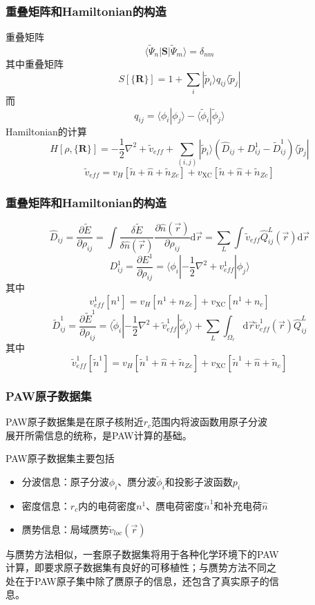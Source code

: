 \documentclass[cjk,slidestop,compress,mathserif,blue]{beamer}
\begin{document}
\frame
{
	\frametitle{重叠矩阵和Hamiltonian的构造}
重叠矩阵
	\begin{displaymath}
		\langle\tilde\Psi_n|\mathbf{S}|\tilde\Psi_m\rangle=\delta_{nm}
	\end{displaymath}
	其中重叠矩阵$$S[\{\mathbf{R}\}]=1+\sum_i|\tilde p_i\rangle q_{ij}\langle\tilde p_j|$$
	而$$q_{ij}=\langle\phi_i|\phi_j\rangle-\langle\tilde\phi_i|\tilde\phi_j\rangle$$
	\textrm{Hamiltonian}的计算
	\begin{displaymath}
		H[\rho,\{\mathbf{R}\}]=-\dfrac12\nabla^2+\tilde v_{eff}+\sum_{(i,j)}|\tilde p_i\rangle(\hat D_{ij}+D_{ij}^1-\tilde D_{ij}^1)\langle\tilde p_j|	
	\end{displaymath}
	$$\tilde v_{eff}=v_H[\tilde n+\hat n+\tilde n_{Zc}]+v_{\mathrm{XC}}[\tilde n+\hat n+\tilde n_{Zc}]$$
}

\frame
{
	\frametitle{重叠矩阵和Hamiltonian的构造}
	$$\hat D_{ij}=\dfrac{\partial\tilde E}{\partial\rho_{ij}}=\int\dfrac{\delta\tilde E}{\delta\hat n(\vec  r)}\dfrac{\partial\hat n(\vec r)}{\partial\rho_{ij}}\mathrm{d}\vec r=\sum_{L}\int\tilde v_{eff}\hat Q_{ij}^L(\vec r)\mathrm{d}\vec r$$
	$$D_{ij}^1=\dfrac{\partial E^1}{\partial\rho_{ij}}=\langle\phi_i|-\dfrac12\nabla^2+v_{eff}^1|\phi_j\rangle$$
	其中$$v_{eff}^1[n^1]=v_H[n^1+n_{Zc}]+v_{\mathrm{XC}}[n^1+n_c]$$
	$$\tilde D_{ij}^1=\dfrac{\partial\tilde E^1}{\partial\rho_{ij}}=\langle\tilde\phi_i|-\dfrac12\nabla^2+\tilde v_{eff}^1|\tilde\phi_j\rangle+\sum_L\int_{\Omega_r}\mathrm{d}\vec r\tilde v_{eff}^1(\vec r)\hat Q_{ij}^L$$
	其中$$\tilde v_{eff}^1[\tilde n^1]=v_H[\tilde n^1+\hat n+\tilde n_{Zc}]+v_{\mathrm{XC}}[\tilde n^1+\hat n+\tilde n_c]$$
}

\frame
{
	\frametitle{\textrm{PAW}原子数据集}
\textrm{PAW}原子数据集是在原子核附近$r_c$范围内将波函数用原子分波\\展开所需信息的统称，是\textrm{PAW}计算的基础。

\textrm{PAW}原子数据集主要包括
	\begin{itemize}
		\item 分波信息：原子分波$\phi_i$、赝分波$\tilde\phi_i$和投影子波函数$p_i$
		\item 密度信息：$r_c$内的电荷密度$n^1$、赝电荷密度$\tilde n^1$和补充电荷$\hat n$
		\item 赝势信息：局域赝势$\tilde v_{loc}(\vec r)$
	\end{itemize}
	与赝势方法相似，一套原子数据集将用于各种化学环境下的\textrm{PAW}\\计算，即要求原子数据集有良好的可移植性；与赝势方法不同之\\处在于\textrm{PAW}原子集中除了赝原子的信息，还包含了真实原子的信\\息。
}
\end{document}
